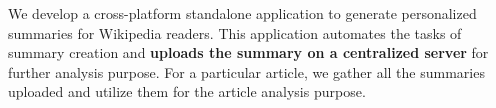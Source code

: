 \documentclass[12pt]{article}
\begin{document}


 

We develop a cross-platform standalone application to generate personalized summaries for Wikipedia readers. This application automates the tasks of summary creation and \textbf{uploads the summary on a centralized server} for further analysis purpose. For a particular article, we gather all the summaries uploaded and utilize them for the article analysis purpose. 

\end{document}
